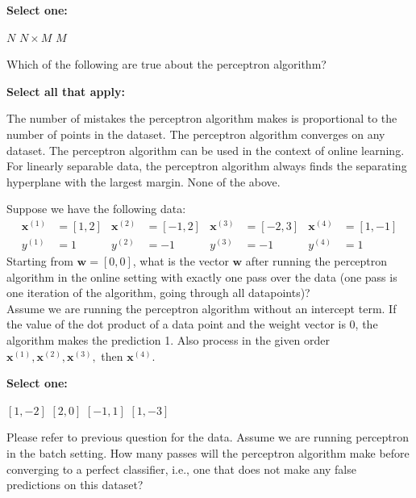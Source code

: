 \documentclass[11pt,addpoints,answers]{exam}
\numberwithin{equation}{section} %
\numberwithin{figure}{section} %
\numberwithin{table}{section} %
\newcommand{\wv}{\mathbf{w}}
\newcommand{\xv}{\mathbf{x}}
\begin{document}
\begin{questions}
    \textbf{Select one:}
    \begin{checkboxes}
        \choice $N$
        \choice $N\times M$
        \choice $M$
    \end{checkboxes}


    
    \question[2] Which of the following are true about the perceptron algorithm?

    \textbf{Select all that apply:}
    {%
    \checkboxchar{$\Box$} \checkedchar{$\blacksquare$}
    \begin{checkboxes}
        \choice The number of mistakes the perceptron algorithm makes is proportional to the number of points in the dataset. 
        \choice The perceptron algorithm converges on any dataset.
        \choice The perceptron algorithm can be used in the context of online learning.
        \choice For linearly separable data, the perceptron algorithm always finds the separating hyperplane with the largest margin.
        \choice None of the above.
    \end{checkboxes}
    }

    
    
    \question[3] Suppose we have the following data:     \begin{align*}
        \xv^{(1)} &= [1,2] & \xv^{(2)} &= [-1,2] & \xv^{(3)} &= [-2,3] & \xv^{(4)} &= [1,-1] \\
        y^{(1)} &= 1 & y^{(2)} &= -1 & y^{(3)} &= -1 & y^{(4)} &= 1
    \end{align*}
    Starting from $\wv = [0,0]$, what is the vector $\wv$ after running the perceptron algorithm in the online setting with exactly one pass over the data (one pass is one iteration of the algorithm, going through all datapoints)? \\
    Assume we are running the perceptron algorithm without an intercept term. If the value of the dot product of a data point and the weight vector is $0$, the algorithm makes the prediction 1. Also process in the given order $\xv^{(1)}, \xv^{(2)}, \xv^{(3)},$ then $\xv^{(4)}$.

    \textbf{Select one:}
    \begin{checkboxes}
        \choice $[1,-2]$
        \choice $[2,0]$
        \choice $[-1,1]$
        \choice $[1,-3]$
    \end{checkboxes}

    
    
    \clearpage

    \question[2] Please refer to previous question for the data. Assume we are running perceptron in the batch setting. How many passes will the perceptron algorithm make before converging to a perfect classifier, i.e., one that does not make any false predictions on this dataset?


\end{questions}
\end{document}
